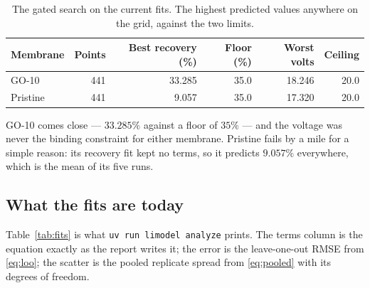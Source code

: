 \begin{table}[htbp]
  \centering
  \caption{The gated search on the current fits. The highest predicted values anywhere on the
           grid, against the two limits.}
  \label{tab:gates}
  \begin{tabular}{@{}lrrrrr@{}}
    \toprule
    Membrane & Points & Best recovery (\%) & Floor (\%) & Worst volts & Ceiling \\
    \midrule
    GO-10    & 441 & 33.285 & 35.0 & 18.246 & 20.0 \\
    Pristine & 441 &  9.057 & 35.0 & 17.320 & 20.0 \\
    \bottomrule
  \end{tabular}
\end{table}

GO-10 comes close --- $33.285\%$ against a floor of $35\%$ --- and the voltage was never the
binding constraint for either membrane. Pristine fails by a mile for a simple reason: its
recovery fit kept no terms, so it predicts $9.057\%$ everywhere, which is the mean of its five
runs.

\subsection{What the fits are today}

Table~\ref{tab:fits} is what \texttt{uv run limodel analyze} prints. The terms column is the
equation exactly as the report writes it; the error is the leave-one-out RMSE from
\eqref{eq:loo}; the scatter is the pooled replicate spread from \eqref{eq:pooled} with its
degrees of freedom.

